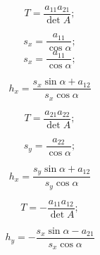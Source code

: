 $$T = \frac{a_{11}a_{21}}{\det{A}};$$

$$s_x = \frac{a_{11}}{\cos\alpha};$$
$$s_x = \frac{a_{11}}{\cos\alpha};$$


\[{h_x}=\frac{{s_x} \sin\alpha+{a_{12}}}{{s_x} \cos\alpha}\]



$$T = \frac{a_{21}a_{22}}{\det A};$$

$$s_y = \frac{a_{22}}{\cos\alpha};$$

\[{h_x}=\frac{{s_y} \sin\alpha+{a_{12}}}{{s_y} \cos\alpha}\]



$$T = -\frac{a_{11}a_{12}}{\det A};$$


\[{h_y}=-\frac{{s_x} \sin\alpha-{a_{21}}}{{s_x} \cos\alpha}\]




